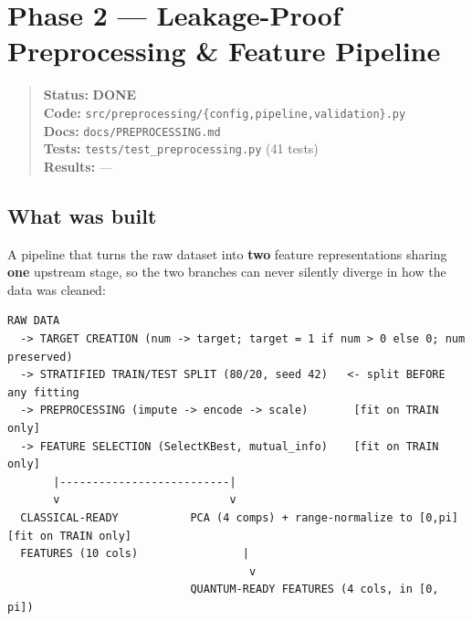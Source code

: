 \documentclass[11pt,a4paper]{article}
\newcommand{\code}[1]{\texttt{\small #1}}
\newcommand{\done}{\textcolor{donecolor}{\textbf{DONE}}}
\newcommand{\phasestatus}[5]{%
\begin{quote}\small\raggedright
\textbf{Status:} #1 \\
\textbf{Code:} #2 \\
\textbf{Docs:} #3 \\
\textbf{Tests:} #4 \\
\textbf{Results:} #5
\end{quote}}
\begin{document}
\section{Phase 2 --- Leakage-Proof Preprocessing \& Feature Pipeline}
\label{sec:phase2}

\phasestatus{\done}{\code{src/preprocessing/\{config,pipeline,validation\}.py}}{\code{docs/PREPROCESSING.md}}{\code{tests/test\_preprocessing.py} (41 tests)}{---}

\subsection{What was built}
A pipeline that turns the raw dataset into \textbf{two} feature representations sharing \textbf{one} upstream stage, so the two branches can never silently diverge in how the data was cleaned:

\begin{center}
\begin{lstlisting}
RAW DATA
  -> TARGET CREATION (num -> target; target = 1 if num > 0 else 0; num preserved)
  -> STRATIFIED TRAIN/TEST SPLIT (80/20, seed 42)   <- split BEFORE any fitting
  -> PREPROCESSING (impute -> encode -> scale)       [fit on TRAIN only]
  -> FEATURE SELECTION (SelectKBest, mutual_info)    [fit on TRAIN only]
       |--------------------------|
       v                          v
  CLASSICAL-READY           PCA (4 comps) + range-normalize to [0,pi]  [fit on TRAIN only]
  FEATURES (10 cols)                |
                                     v
                            QUANTUM-READY FEATURES (4 cols, in [0, pi])
\end{lstlisting}
\end{center}
\end{document}
